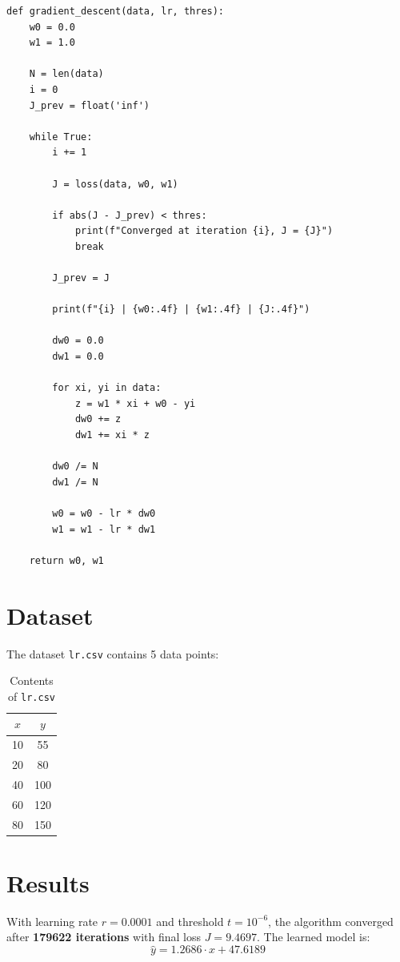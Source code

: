 \documentclass{article}
\begin{document}
\begin{verbatim}
def gradient_descent(data, lr, thres):
    w0 = 0.0
    w1 = 1.0

    N = len(data)
    i = 0
    J_prev = float('inf')

    while True:
        i += 1

        J = loss(data, w0, w1)

        if abs(J - J_prev) < thres:
            print(f"Converged at iteration {i}, J = {J}")
            break

        J_prev = J

        print(f"{i} | {w0:.4f} | {w1:.4f} | {J:.4f}")

        dw0 = 0.0
        dw1 = 0.0

        for xi, yi in data:
            z = w1 * xi + w0 - yi
            dw0 += z
            dw1 += xi * z

        dw0 /= N
        dw1 /= N

        w0 = w0 - lr * dw0
        w1 = w1 - lr * dw1

    return w0, w1
\end{verbatim}

\section*{Dataset}

The dataset \texttt{lr.csv} contains 5 data points:

\begin{table}[H]
\centering
\begin{tabular}{cc}
\toprule
$x$ & $y$ \\
\midrule
10 & 55  \\
20 & 80  \\
40 & 100 \\
60 & 120 \\
80 & 150 \\
\bottomrule
\end{tabular}
\caption{Contents of \texttt{lr.csv}}
\end{table}

\section*{Results}

With learning rate $r = 0.0001$ and threshold $t = 10^{-6}$, the algorithm
converged after \textbf{179622 iterations} with final loss $J = 9.4697$.
The learned model is:
\[
  \hat{y} = 1.2686 \cdot x + 47.6189
\]
\end{document}
